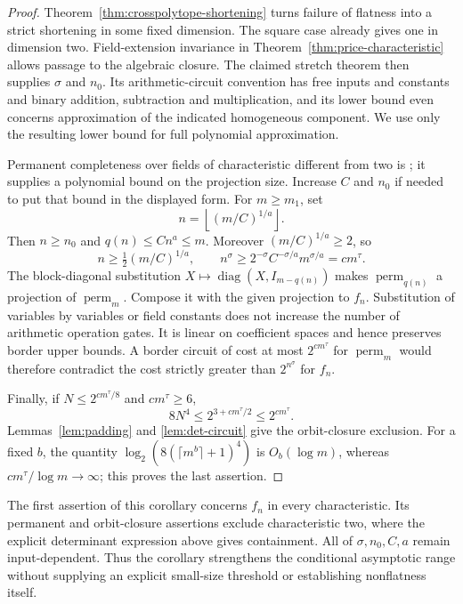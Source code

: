 \begin{proof}
Theorem~\ref{thm:crosspolytope-shortening} turns failure of
flatness into a strict shortening in some fixed dimension.
The square case already gives one in dimension two.
Field-extension invariance in
Theorem~\ref{thm:price-characteristic} allows passage to the
algebraic closure.  The claimed stretch theorem then supplies
$\sigma$ and $n_0$.  Its arithmetic-circuit convention has free
inputs and constants and binary addition, subtraction and
multiplication, and its lower bound even concerns approximation
of the indicated homogeneous component.  We use only the
resulting lower bound for full polynomial approximation.

Permanent completeness over fields of characteristic different
from two is \cite[Theorem~2]{Valiant1979}; it supplies a
polynomial bound on the projection size.  Increase $C$ and
$n_0$ if needed to put that bound in the displayed form.
For $m\geq m_1$, set
\[
 n=\left\lfloor(m/C)^{1/a}\right\rfloor.
\]
Then $n\geq n_0$ and $q(n)\leq Cn^a\leq m$.
Moreover $(m/C)^{1/a}\geq2$, so
\[
 n\geq\tfrac12(m/C)^{1/a},\qquad
 n^\sigma\geq2^{-\sigma}C^{-\sigma/a}m^{\sigma/a}
             =c m^\tau.
\]
The block-diagonal substitution
$X\mapsto\operatorname{diag}(X,I_{m-q(n)})$ makes
$\operatorname{perm}_{q(n)}$ a projection of
$\operatorname{perm}_m$.  Compose it with the given projection
to $f_n$.  Substitution of variables by variables or field
constants does not increase the number of arithmetic operation
gates.  It is linear on coefficient spaces and hence preserves
border upper bounds.  A border circuit of cost at most
$2^{c m^\tau}$ for $\operatorname{perm}_m$ would therefore
contradict the cost strictly greater than $2^{n^\sigma}$ for
$f_n$.

Finally, if $N\leq2^{c m^\tau/8}$ and $c m^\tau\geq6$,
\[
 8N^4\leq2^{3+c m^\tau/2}\leq2^{c m^\tau}.
\]
Lemmas~\ref{lem:padding} and \ref{lem:det-circuit} give the
orbit-closure exclusion.  For a fixed $b$, the quantity
$\log_2(8(\lceil m^b\rceil+1)^4)$ is $O_b(\log m)$,
whereas $c m^\tau/\log m\longrightarrow\infty$;
this proves the last assertion.
\end{proof}

The first assertion of this corollary concerns $f_n$ in every
characteristic.  Its permanent and orbit-closure assertions
exclude characteristic two, where the explicit determinant
expression above gives containment.  All of $\sigma,n_0,C,a$
remain input-dependent.  Thus the corollary strengthens the
conditional asymptotic range without supplying an explicit
small-size threshold or establishing nonflatness itself.

